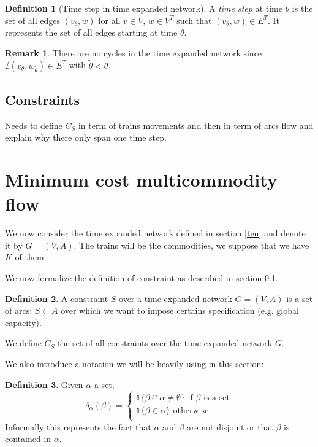 \documentclass[14pt,a4paper]{article}
\theoremstyle{definition}
\newtheorem{madef}{Definition}[section]
\newtheorem*{remark}{Remark}
\numberwithin{equation}{subsection}
\begin{document}
\begin{madef}[Time step in time expanded network]	
	A \emph{time step} at time $\theta$ is the set of all edges $(v_\theta,w)$ for all $v \in V$, $w \in V^T$ such that $(v_\theta,w) \in E^T$. 
	It represents the set of all edges starting at time $\theta$.
\end{madef}



\begin{remark}
	There are no cycles in the time expanded network since $\nexists (v_\theta,w_{\tilde{\theta}}) \in E^T$ with $\tilde{\theta} < \theta$.
\end{remark}
	
\subsection{Constraints}
\label{sec:constraints}
Needs to define $C_S$ in term of trains movements and then in term of arcs flow and explain why there only span one time step.



\newpage
\section{Minimum cost multicommodity flow}

We now consider the time expanded network defined in section \ref*{ten} and denote it by $G = (V,A)$. The trains will be the commodities, we suppose that we have $K$ of them.

We now formalize the definition of constraint as described in section \ref*{sec:constraints}.

\begin{madef}
	A constraint $S$ over a time expanded network $G = (V,A)$ is a set of arcs: $S \subset A$ over which we want to impose certains specification (e.g. global capacity).
	
	We define $C_S$ the set of all constraints over the time expanded network $G$.
\end{madef}



We also introduce a notation we will be heavily using in this section:
\begin{madef}
	Given $\alpha$ a set,
	\[
	\delta_\alpha(\beta)=\left\{
	\begin{array}{ll}
	 \mathds{1}{\{\beta \cap \alpha \neq \emptyset\}} \text{ if } \beta \text{ is a set}\\
	\mathds{1}{\{\beta \in \alpha\}} \text{ otherwise}\\
	\end{array}
	\right.
	\]
	Informally this represents the fact that $\alpha$ and $\beta$ are not disjoint or that $\beta$ is contained in $\alpha$.

\end{madef}
\end{document}
